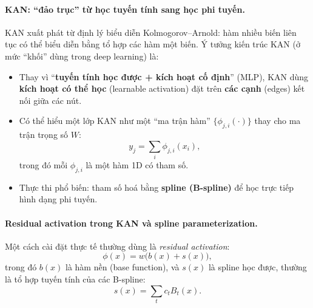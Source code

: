 \documentclass[../DoAn.tex]{subfiles}
\begin{document}
\paragraph{KAN: ``đảo trục'' từ học tuyến tính sang học phi tuyến.}
KAN xuất phát từ định lý biểu diễn Kolmogorov--Arnold: hàm nhiều biến liên tục có thể biểu diễn bằng tổ hợp các hàm một biến.
Ý tưởng kiến trúc KAN (ở mức ``khối'' dùng trong deep learning) là:

\begin{itemize}
  \item Thay vì ``\textbf{tuyến tính học được + kích hoạt cố định}'' (MLP), KAN dùng \textbf{kích hoạt có thể học} (learnable activation)
    đặt trên \textbf{các cạnh} (edges) kết nối giữa các nút.

  \item Có thể hiểu một lớp KAN như một ``ma trận hàm'' $\{\phi_{j,i}(\cdot)\}$ thay cho ma trận trọng số $W$:
    \begin{equation}
      y_j = \sum_i \phi_{j,i}(x_i),
    \end{equation}
    trong đó mỗi $\phi_{j,i}$ là một hàm 1D có tham số.

  \item Thực thi phổ biến: tham số hoá bằng \textbf{spline (B-spline)} để học trực tiếp hình dạng phi tuyến.
\end{itemize}

\paragraph{Residual activation trong KAN và spline parameterization.}
Một cách cài đặt thực tế thường dùng là \textit{residual activation}:
\begin{equation}
  \phi(x) = w\big(b(x)+s(x)\big),
\end{equation}
trong đó $b(x)$ là hàm nền (base function), và $s(x)$ là spline học được, thường là tổ hợp tuyến tính của các B-spline:
\begin{equation}
  s(x) = \sum_{t} c_t B_t(x).
\end{equation}
\end{document}
